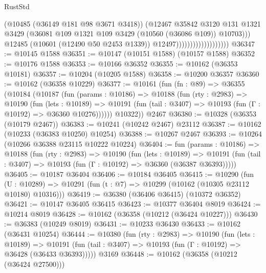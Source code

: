 \begin{lexlean}{RustStd}
\begin{coremodule}
                                            (@10485 (@36149 @181 @98 @3671 @3418))
                                            (@12467
                                              @35842
                                              @3120
                                              @131
                                              @1321
                                              @3429
                                              (@36081
                                                @109
                                                @1321
                                                @109
                                                @3429
                                                (@10560 (@36086 @109))
                                                @10703)))
                                          @12485
                                          (@10601 (@12490 @50 @2453 @1339))
                                          @12497)))))))))))))))))))
@36347 := @10145 @1588
@36351 := @10147 (@10151 @1588) (@10157 @1588)
@36352 := @10176 @1588
@36353 := @10166 @36352
@36355 := @10162 (@36353 @10181)
@36357 := @10204 (@10205 @1588)
@36358 := @10200 @36357
@36360 := @10162 (@36358 @10229)
@36377 := @10161
    (fun (fn : @89) =>
    @36355
      (@10184
        (@10187
          (fun (params : @10186) =>
          @10188
            (fun (rty : @2983) =>
            @10190
              (fun (lets : @10189) =>
              @10191 (fun (tail : @3407) => @10193 (fun (Γ : @10192) => @36360 @10276))))))
        @10322))
    @2467
@36380 := @10328 (@36353 (@10179 @2467))
@36383 := @10241 (@10242 @2467) @23112
@36387 := @10162 (@10233 (@36383 @10250) @10254)
@36388 := @10267 @2467
@36393 := @10264 (@10266 @36388 @23115 @10222 @10224)
@36404 := fun (params : @10186) =>
  @10188
    (fun (rty : @2983) =>
    @10190
      (fun (lets : @10189) =>
      @10191 (fun (tail : @3407) => @10193 (fun (Γ : @10192) => @36360 (@36387 @36393)))))
@36405 := @10187 @36404
@36406 := @10184 @36405
@36415 := @10290
    (fun (U : @10289) => @10291 (fun (t : @7) => @10299 (@10162 (@10305 @23112 @10180) @10316)))
@36419 := @36380 (@36406 @36415) (@10372 @36352)
@36421 := @10147 @36405 @36415
@36423 := @10377 @36404 @8019
@36424 := @10214 @8019
@36428 := @10162 (@36358 (@10212 (@36424 @10227)))
@36430 := @36383 (@10249 @8019)
@36431 := @10233 @36430
@36433 := @10162 (@36431 @10254)
@36444 := @10380
    (fun (rty : @2983) =>
    @10190
      (fun (lets : @10189) =>
      @10191 (fun (tail : @3407) => @10193 (fun (Γ : @10192) => @36428 (@36433 @36393)))))
    @3169
@36448 := @10162 (@36358 (@10212 (@36424 @27500)))

\end{coremodule}
\end{lexlean}
